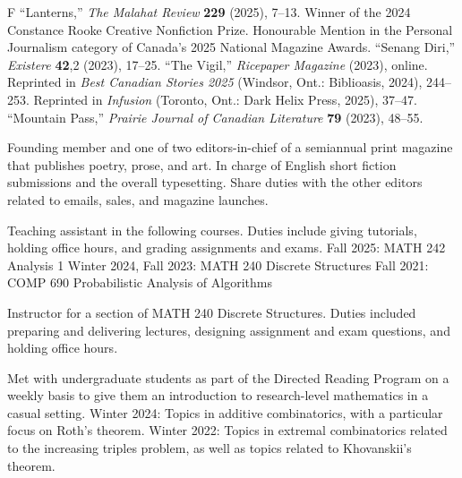 \goodbreak


\pubbegin F
\starficitem ``Lanterns,'' {\sl The Malahat Review} {\bf 229} (2025), 7--13.
Winner of the 2024 Constance Rooke Creative Nonfiction Prize. Honourable Mention in the Personal Journalism
category of Canada's 2025 National Magazine Awards.
\ficitem ``Senang Diri,'' {\sl Existere} {\bf 42},2 (2023), 17--25.
\ficitem ``The Vigil,'' {\sl Ricepaper Magazine} (2023), online. Reprinted in
{\sl Best Canadian Stories 2025} (Windsor, Ont.: Biblioasis, 2024), 244--253.
Reprinted in {\sl Infusion} (Toronto, Ont.: Dark Helix Press, 2025), 37--47.
\ficitem ``Mountain Pass,'' {\sl Prairie Journal of Canadian Literature} {\bf 79} (2023), 48--55.
\endgroup%


\smallskip
Founding member and one of two editors-in-chief of
a semiannual print magazine that publishes poetry, prose, and art.
In charge of English short fiction submissions and the overall typesetting. Share duties with the other
editors related to emails, sales, and magazine launches.
\medbreak

\smallskip
Teaching assistant in the following courses. Duties include giving tutorials, holding office hours, and
grading assignments and exams.
\begingroup\parindent=10pt
\smallskip
\thing Fall 2025: MATH 242 Analysis 1
\smallskip
\thing Winter 2024, Fall 2023: MATH 240 Discrete Structures
\smallskip
\thing Fall 2021: COMP 690 Probabilistic Analysis of Algorithms
\endgroup
\medbreak

\smallskip
Instructor for a section of MATH 240 Discrete Structures. Duties included preparing and delivering lectures,
designing assignment and exam questions, and holding office hours.
\medbreak

\smallskip
Met with undergraduate students as part of the Directed Reading Program
on a weekly basis to give them an introduction to research-level
mathematics in a casual setting.
\begingroup\parindent=10pt
\smallskip
\thing Winter 2024: Topics in additive combinatorics, with a particular focus on Roth's theorem.
\smallskip
\thing Winter 2022: Topics in extremal combinatorics related to the increasing
triples problem, as well as topics related to Khovanskii's theorem.
\endgroup
\medbreak

